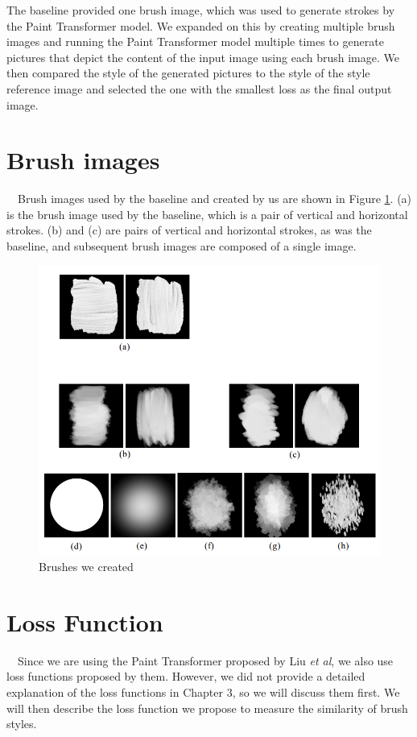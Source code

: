 The baseline provided one brush image, which was used to generate 
strokes by the Paint Transformer model. 
We expanded on this by creating multiple brush images and running 
the Paint Transformer model multiple times to generate pictures 
that depict the content of the input image using each brush image.
We then compared the style of the generated pictures to the style 
of the style reference image and selected the one with the 
smallest loss as the final output image. 

\section{Brush images}
　Brush images used by the baseline and created by us are shown in Figure \ref{Brushes}.
(a) is the brush image used by the baseline, which is a pair of vertical and 
horizontal strokes. 
(b) and (c) are pairs of vertical and horizontal strokes, as was the baseline, 
and subsequent brush images are composed of a single image.
\begin{figure}[h]
    \centering
    \includegraphics[width=130truemm]{resources/4_methods/brushes.png}
    \caption{
        Brushes we created
    }
    \label{Brushes}
\end{figure}

\section{Loss Function}
　Since we are using the Paint Transformer proposed by Liu \textit{et al}, 
we also use loss functions proposed by them. However, we did not provide a 
detailed explanation of the loss functions in Chapter 3, so we will discuss 
them first. We will then describe the loss function we propose to measure 
the similarity of brush styles.

